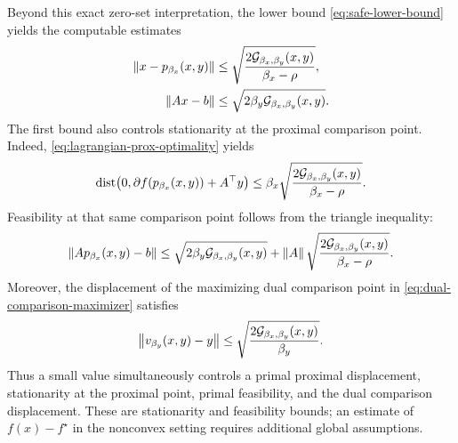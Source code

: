 Beyond this exact zero-set interpretation, the lower bound
\cref{eq:safe-lower-bound} yields the computable estimates
\begin{align}
  \left\lVert x-p_{\beta_x}(x,y)\right\rVert
    &\le
    \sqrt{\frac{2\mathcal{G}_{\beta_x,\beta_y}(x,y)}
                 {\beta_x-\rho}}, \label{eq:prox-bound-from-gap}\\
  \left\lVert Ax-b\right\rVert
    &\le
    \sqrt{2\beta_y\mathcal{G}_{\beta_x,\beta_y}(x,y)}.
    \label{eq:feas-bound-from-gap}
\end{align}
The first bound also controls stationarity at the proximal comparison point.
Indeed, \cref{eq:lagrangian-prox-optimality} yields
\begin{equation}
  \operatorname{dist}\!\left(
    0,\partial f(p_{\beta_x}(x,y))+A^\top y
  \right)
  \le
  \beta_x
  \sqrt{\frac{2\mathcal{G}_{\beta_x,\beta_y}(x,y)}
             {\beta_x-\rho}}.
  \label{eq:stationarity-at-prox-from-gap}
\end{equation}
Feasibility at that same comparison point follows from the triangle
inequality:
\begin{equation}
  \left\lVert Ap_{\beta_x}(x,y)-b\right\rVert
  \le \sqrt{2\beta_y\mathcal{G}_{\beta_x,\beta_y}(x,y)}
  +\left\lVert A\right\rVert\sqrt{\frac{2\mathcal{G}_{\beta_x,\beta_y}(x,y)}{\beta_x-\rho}}.
  \label{eq:prox-feasibility-from-gap}
\end{equation}
Moreover, the displacement of the maximizing dual comparison point in
\cref{eq:dual-comparison-maximizer} satisfies
\begin{equation}
  \left\lVert v_{\beta_y}(x,y)-y\right\rVert
  \le
  \sqrt{\frac{2\mathcal{G}_{\beta_x,\beta_y}(x,y)}{\beta_y}}.
  \label{eq:dual-displacement-from-gap}
\end{equation}
Thus a small value simultaneously controls a primal proximal displacement,
stationarity at the proximal point, primal feasibility, and the dual
comparison displacement.  These are stationarity and feasibility bounds; an
estimate of \(f(x)-f^\star\) in the nonconvex setting requires additional
global assumptions.

